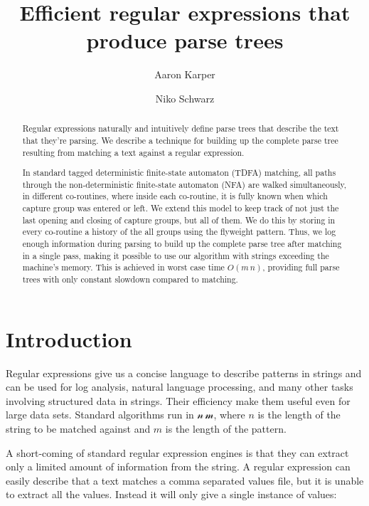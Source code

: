 \documentclass[11pt]{Thesis}
\author{Aaron Karper \and Niko Schwarz}
\theoremstyle{definition}
\begin{document}
\setlength{\pdfpageheight}{\paperheight}
\setlength{\pdfpagewidth}{\paperwidth}

\frenchspacing

\title{Efficient regular expressions that produce parse trees}

\maketitle

\begin{abstract}
Regular expressions naturally and intuitively define parse trees that describe
the text that they're parsing.  We describe a technique for building up the
complete parse tree resulting from matching a text against a regular
expression.

In standard tagged deterministic finite-state automaton (TDFA) matching, all
paths through the non-deterministic finite-state automaton (NFA) are walked
simultaneously, in different co-routines, where inside each co-routine, it is
fully known when which capture group was entered or left. We extend this model
to keep track of not just the last opening and closing of capture groups, but
all of them. We do this by storing in every co-routine a history of the all
groups using the flyweight pattern. Thus, we log enough information during
parsing to build up the complete parse tree after matching in a single pass, 
making it possible to use our algorithm with strings exceeding the machine's
memory. This is achieved in  worst case time $O(m\,n)$, providing full parse 
trees with only constant slowdown compared to matching.
\end{abstract}

\tableofcontents

\chapter{Introduction}

Regular expressions give us a concise language to describe patterns in 
strings and can be used for log analysis, natural language processing, and 
many other tasks involving structured data in strings. Their efficiency make 
them useful even for large data sets. Standard algorithms run in 
$\mathcal{n\, m}$, where $n$ is the length of the string to be matched 
against and $m$ is the length of the pattern\cite{Sedg90a}.

A short-coming of standard regular expression engines is that they can 
extract only a limited amount of information from the string. A regular
expression can easily describe that a text matches a comma separated values
file, but it is unable to extract all the values.  Instead it will only give a
single instance of values:
\end{document}
